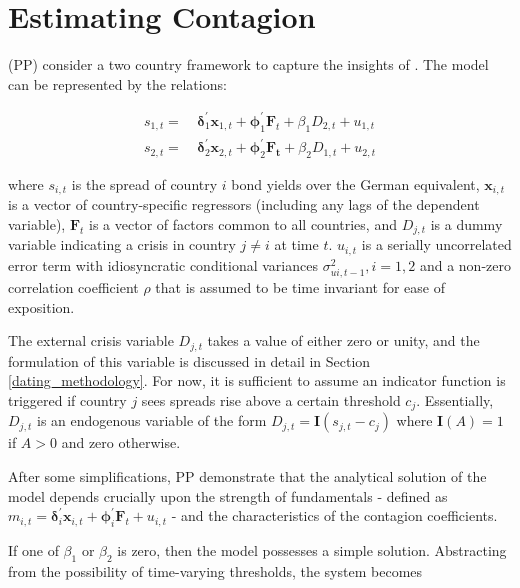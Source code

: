\documentclass[../base.tex]{subfiles}
\begin{document}
\section{Estimating Contagion}
\label{est}

\cite{pesaran2007econometric} (PP) consider a two country framework to capture the insights of \cite{masson1999contagion}. The model can be represented by the relations:

\begin{align} 
	s_{1,t} =&~\boldsymbol{\delta}_1^{\prime} \mathbf{x}_{1,t} + \boldsymbol{\phi}_1^{\prime} \mathbf{F}_t + \beta_1 D_{2,t} + u_{1,t} \label{eqn:system}\\
	s_{2,t} =&~\boldsymbol{\delta}_2^{\prime} \mathbf{x}_{2,t} + \boldsymbol{\phi}_2^{\prime} \mathbf{F_t} + \beta_2 D_{1,t} + u_{2,t} \label{eqn:system2}
\end{align}

where $s_{i,t}$ is the spread of country $i$ bond yields over the German equivalent, $\mathbf{x}_{i,t}$ is a vector of country-specific regressors (including any lags of the dependent variable), $\mathbf{F}_t$ is a vector of factors common to all countries, and $D_{j, t}$ is a dummy variable indicating a crisis in country $j \neq i$ at time $t$. $u_{i, t}$ is a serially uncorrelated error term with idiosyncratic conditional variances $\sigma^2_{ui, t-1}, i = 1, 2$ and a non-zero correlation coefficient $\rho$ that is assumed to be time invariant for ease of exposition. 

The external crisis variable $D_{j, t}$ takes a value of either zero or unity, and the formulation of this variable is discussed in detail in Section \ref{dating_methodology}. For now, it is sufficient to assume an indicator function is triggered if country $j$ sees spreads rise above a certain threshold $c_j$. Essentially, $D_{j,t}$ is an endogenous variable of the form $D_{j, t} = \mathbf{I}(s_{j, t} - c_j)$ where $\mathbf{I}(A) = 1$ if $A >0$ and zero otherwise.

After some simplifications, PP demonstrate that the analytical solution of the model depends crucially upon the strength of fundamentals - defined as $m_{i,t} = \boldsymbol{\delta}_i^{\prime} \mathbf{x}_{i,t} + \boldsymbol{\phi}_i^{\prime} \mathbf{F}_t + u_{i,t}$ - and the characteristics of the contagion coefficients. 

If one of $\beta_1$ or $\beta_2$ is zero, then the model possesses a simple solution. Abstracting from the possibility of time-varying thresholds, the system becomes
\end{document}
